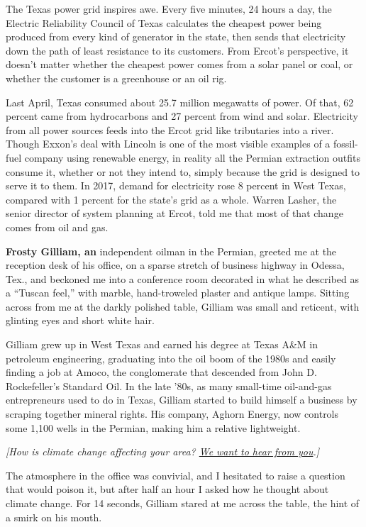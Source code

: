 The Texas power grid inspires awe. Every five minutes, 24 hours a day,
the Electric Reliability Council of Texas calculates the cheapest power
being produced from every kind of generator in the state, then sends
that electricity down the path of least resistance to its customers.
From Ercot's perspective, it doesn't matter whether the cheapest power
comes from a solar panel or coal, or whether the customer is a
greenhouse or an oil rig.

Last April, Texas consumed about 25.7 million megawatts of power. Of
that, 62 percent came from hydrocarbons and 27 percent from wind and
solar. Electricity from all power sources feeds into the Ercot grid like
tributaries into a river. Though Exxon's deal with Lincoln is one of the
most visible examples of a fossil-fuel company using renewable energy,
in reality all the Permian extraction outfits consume it, whether or not
they intend to, simply because the grid is designed to serve it to them.
In 2017, demand for electricity rose 8 percent in West Texas, compared
with 1 percent for the state's grid as a whole. Warren Lasher, the
senior director of system planning at Ercot, told me that most of that
change comes from oil and gas.

\textbf{Frosty Gilliam, an} independent oilman in the Permian, greeted
me at the reception desk of his office, on a sparse stretch of business
highway in Odessa, Tex., and beckoned me into a conference room
decorated in what he described as a ``Tuscan feel,'' with marble,
hand-troweled plaster and antique lamps. Sitting across from me at the
darkly polished table, Gilliam was small and reticent, with glinting
eyes and short white hair.

Gilliam grew up in West Texas and earned his degree at Texas A\&M in
petroleum engineering, graduating into the oil boom of the 1980s and
easily finding a job at Amoco, the conglomerate that descended from John
D. Rockefeller's Standard Oil. In the late '80s, as many small-time
oil-and-gas entrepreneurs used to do in Texas, Gilliam started to build
himself a business by scraping together mineral rights. His company,
Aghorn Energy, now controls some 1,100 wells in the Permian, making him
a relative lightweight.

\emph{{[}How is climate change affecting your area?
\href{https://www.nytimes3xbfgragh.onion/2019/03/11/reader-center/climate-change.html}{We
want to hear from you}.{]}}

The atmosphere in the office was convivial, and I hesitated to raise a
question that would poison it, but after half an hour I asked how he
thought about climate change. For 14 seconds, Gilliam stared at me
across the table, the hint of a smirk on his mouth.

